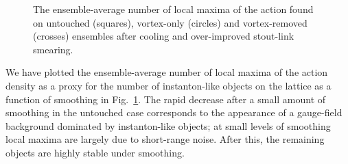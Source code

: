 \documentclass[
 reprint,
 amsmath,amssymb,
 aps,
prd,
]{revtex4-1}
\begin{document}
\begin{figure}[thpb]
\caption{The ensemble-average number of local maxima of the action found on untouched (squares), vortex-only (circles) and vortex-removed (crosses) ensembles after cooling  and over-improved stout-link smearing. }
\label{Fig:num}
\end{figure}
We have plotted the ensemble-average number of local maxima of the action density as a proxy for the number of instanton-like objects on the lattice  as a function of smoothing in Fig.~\ref{Fig:num}. The rapid decrease after a small amount of smoothing in the untouched case corresponds to the appearance of a gauge-field background dominated by instanton-like objects; at small levels of smoothing local maxima are largely due to short-range noise. After this, the remaining objects are highly stable under smoothing. \par
\end{document}
